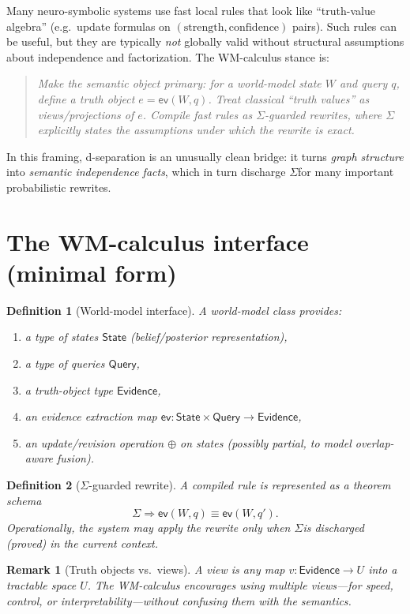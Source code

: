 \documentclass[11pt]{article}
\newtheorem{definition}{Definition}
\newtheorem{remark}{Remark}
\newcommand{\State}{\mathsf{State}}
\newcommand{\Query}{\mathsf{Query}}
\newcommand{\Evidence}{\mathsf{Evidence}}
\newcommand{\side}{\ensuremath{\Sigma}}
\newcommand{\revise}{\mathbin{\oplus}}
\newcommand{\ev}{\mathsf{ev}}
\begin{document}
Many neuro-symbolic systems use fast local rules that look like
``truth-value algebra'' (e.g.\ update formulas on $(\text{strength},\text{confidence})$ pairs).
Such rules can be useful, but they are typically \emph{not} globally valid without structural assumptions
about independence and factorization. The WM-calculus stance is:

\begin{quote}
\emph{Make the semantic object primary: for a world-model state $W$ and query $q$, define a truth object
$e=\ev(W,q)$. Treat classical ``truth values'' as views/projections of $e$. Compile fast rules as \side-guarded rewrites,
where \side explicitly states the assumptions under which the rewrite is exact.}
\end{quote}

In this framing, d-separation is an unusually clean bridge:
it turns \emph{graph structure} into \emph{semantic independence facts}, which in turn discharge \side for
many important probabilistic rewrites.

\section{The WM-calculus interface (minimal form)}

\begin{definition}[World-model interface]
A world-model class provides:
\begin{enumerate}[leftmargin=2em]
\item a type of states $\State$ (belief/posterior representation),
\item a type of queries $\Query$,
\item a truth-object type $\Evidence$,
\item an evidence extraction map $\ev : \State \times \Query \to \Evidence$,
\item an update/revision operation $\revise$ on states (possibly partial, to model overlap-aware fusion).
\end{enumerate}
\end{definition}

\begin{definition}[\side-guarded rewrite]
A compiled rule is represented as a theorem schema
\[
  \side \Rightarrow \ev(W,q) \equiv \ev(W,q').
\]
Operationally, the system may apply the rewrite only when \side is discharged (proved) in the current context.
\end{definition}

\begin{remark}[Truth objects vs.\ views]
A view is any map $v : \Evidence \to U$ into a tractable space $U$.
The WM-calculus encourages using multiple views---for speed, control, or interpretability---without confusing them
with the semantics.
\end{remark}
\end{document}
